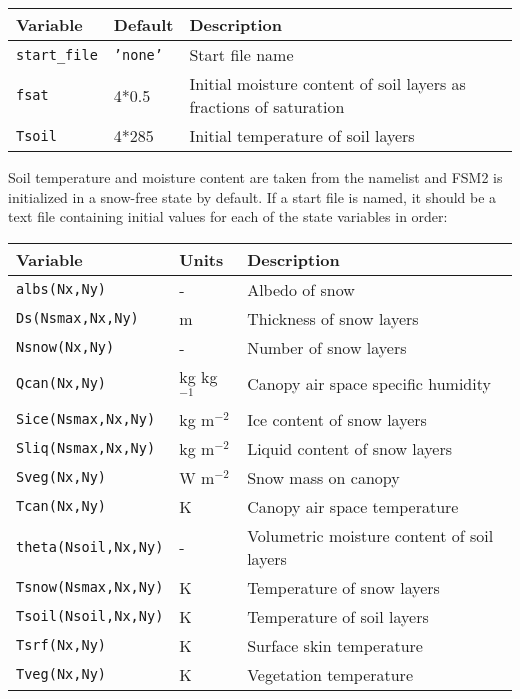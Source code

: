 \documentclass{article}
\begin{document}
\begin{longtable}{|l|l|l|}
\hline
Variable & Default & Description \\
\hline
{\tt start\_file}  & {\tt 'none'}  & Start file name                                      \\
{\tt fsat}  & 4*0.5  & Initial moisture content of soil layers as fractions of saturation \\
{\tt Tsoil} & 4*285  & Initial temperature of soil layers                                 \\

\hline 
\end{longtable}

Soil temperature and moisture content are taken from the namelist and FSM2 is initialized in a snow-free state by default. If a start file is named, it should be a text file containing initial values for each of the state variables in order:

\begin{longtable}{|l|l|l|}
\hline
Variable & Units & Description \\
\hline
{\tt albs(Nx,Ny)}        & -            & Albedo of snow                             \\
{\tt Ds(Nsmax,Nx,Ny)}    & m            & Thickness of snow layers                   \\
{\tt Nsnow(Nx,Ny)}       & -            & Number of snow layers                      \\
{\tt Qcan(Nx,Ny)}        & kg kg$^{-1}$ & Canopy air space specific humidity         \\
{\tt Sice(Nsmax,Nx,Ny)}  & kg m$^{-2}$  & Ice content of snow layers                 \\
{\tt Sliq(Nsmax,Nx,Ny)}  & kg m$^{-2}$  & Liquid content of snow layers              \\
{\tt Sveg(Nx,Ny)}        & W m$^{-2}$   & Snow mass on canopy                        \\
{\tt Tcan(Nx,Ny)}        & K            & Canopy air space temperature               \\
{\tt theta(Nsoil,Nx,Ny)} & -            & Volumetric moisture content of soil layers \\
{\tt Tsnow(Nsmax,Nx,Ny)} & K            & Temperature of snow layers                 \\
{\tt Tsoil(Nsoil,Nx,Ny)} & K            & Temperature of soil layers                 \\
{\tt Tsrf(Nx,Ny)}        & K            & Surface skin temperature                   \\
{\tt Tveg(Nx,Ny)}        & K            & Vegetation temperature                     \\
\hline 
\end{longtable}
\end{document}
